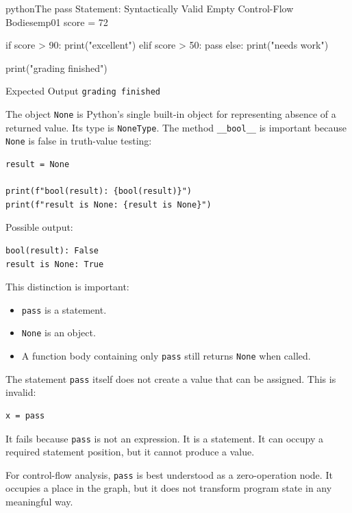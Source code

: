 \documentclass[a4paper,twoside]{report}
\begin{document}
\begin{codebox}[]{python}{The pass Statement: Syntactically Valid Empty Control-Flow Bodies}{emp01}
score = 72

if score > 90:
    print("excellent")
elif score > 50:
    pass
else:
    print("needs work")

print("grading finished")
\end{codebox}


\begin{iobox}{Expected Output}
\texttt{grading finished} \\
\end{iobox}




The object \texttt{None} is Python's single built-in object for representing absence of a returned value. Its type is \texttt{NoneType}. The method \texttt{\_\_bool\_\_} is important because \texttt{None} is false in truth-value testing:

\begin{verbatim}
result = None

print(f"bool(result): {bool(result)}")
print(f"result is None: {result is None}")
\end{verbatim}

Possible output:

\begin{verbatim}
bool(result): False
result is None: True
\end{verbatim}

This distinction is important:

\begin{itemize}
    \item \texttt{pass} is a statement.
    \item \texttt{None} is an object.
    \item A function body containing only \texttt{pass} still returns \texttt{None} when called.
\end{itemize}

The statement \texttt{pass} itself does not create a value that can be assigned. This is invalid:

\begin{verbatim}
x = pass
\end{verbatim}

It fails because \texttt{pass} is not an expression. It is a statement. It can occupy a required statement position, but it cannot produce a value.

For control-flow analysis, \texttt{pass} is best understood as a zero-operation node. It occupies a place in the graph, but it does not transform program state in any meaningful way.
\end{document}
